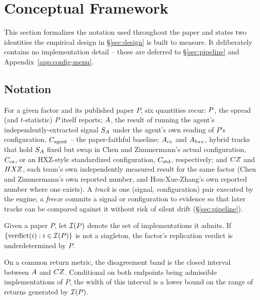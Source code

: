 \section{Conceptual Framework}
\label{sec:framework}

This section formalizes the notation used throughout the paper and states
two identities the empirical design in \S\ref{sec:design} is built to
measure. It deliberately contains no implementation detail -- those are
deferred to \S\ref{sec:pipeline} and Appendix~\ref{app:config-menu}.

\subsection{Notation}

For a given factor and its published paper $P$, six quantities recur:
$P$, the spread (and $t$-statistic) $P$ itself reports; $A$, the
result of running the agent's independently-extracted signal $S_A$ under
the agent's own reading of $P$'s configuration, $C_{\text{agent}}$ -- the
paper-faithful baseline; $A_{cz}$ and $A_{hxz}$, hybrid tracks that hold $S_A$
fixed but swap in Chen and Zimmermann's actual configuration, $C_{\text{cz}}$, or an
HXZ-style standardized configuration, $C_{\text{std}}$, respectively; and $CZ$ and
$HXZ$, each team's own independently measured result for the same factor
(Chen and Zimmermann's own reported number, and Hou-Xue-Zhang's own reported
number where one exists). A \emph{track} is one (signal, configuration)
pair executed by the engine; a \emph{freeze} commits a signal or
configuration to evidence so that later tracks can be compared against it
without risk of silent drift (\S\ref{sec:pipeline}).

\begin{definition}[Underdetermination]
Given a paper $P$, let $\mathcal{I}(P)$ denote the set of implementations it
admits. If $\{\mathrm{verdict}(i) : i \in \mathcal{I}(P)\}$ is not a
singleton, the factor's replication verdict is underdetermined by $P$.
\end{definition}

\begin{definition}
On a common return metric, the disagreement band is the closed interval
between $A$ and $CZ$. Conditional on both endpoints being admissible
implementations of $P$, the width of this interval is a lower bound on the
range of returns generated by $\mathcal{I}(P)$.
\end{definition}

